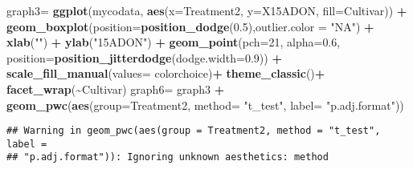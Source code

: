 \documentclass[
]{article}
\newenvironment{Shaded}{\begin{snugshade}}{\end{snugshade}}
\newcommand{\AttributeTok}[1]{\textcolor[rgb]{0.13,0.29,0.53}{#1}}
\newcommand{\DecValTok}[1]{\textcolor[rgb]{0.00,0.00,0.81}{#1}}
\newcommand{\FloatTok}[1]{\textcolor[rgb]{0.00,0.00,0.81}{#1}}
\newcommand{\FunctionTok}[1]{\textcolor[rgb]{0.13,0.29,0.53}{\textbf{#1}}}
\newcommand{\NormalTok}[1]{#1}
\newcommand{\OtherTok}[1]{\textcolor[rgb]{0.56,0.35,0.01}{#1}}
\newcommand{\SpecialCharTok}[1]{\textcolor[rgb]{0.81,0.36,0.00}{\textbf{#1}}}
\newcommand{\StringTok}[1]{\textcolor[rgb]{0.31,0.60,0.02}{#1}}
\begin{document}
\begin{Shaded}
\begin{Highlighting}[]
\NormalTok{graph3}\OtherTok{=} \FunctionTok{ggplot}\NormalTok{(mycodata, }\FunctionTok{aes}\NormalTok{(}\AttributeTok{x=}\NormalTok{Treatment2, }\AttributeTok{y=}\NormalTok{X15ADON, }\AttributeTok{fill=}\NormalTok{Cultivar)) }\SpecialCharTok{+}
  \FunctionTok{geom\_boxplot}\NormalTok{(}\AttributeTok{position=}\FunctionTok{position\_dodge}\NormalTok{(}\FloatTok{0.5}\NormalTok{),}\AttributeTok{outlier.color =} \StringTok{"NA"}\NormalTok{) }\SpecialCharTok{+}
  \FunctionTok{xlab}\NormalTok{(}\StringTok{""}\NormalTok{) }\SpecialCharTok{+} \FunctionTok{ylab}\NormalTok{(}\StringTok{"15ADON"}\NormalTok{) }\SpecialCharTok{+}
  \FunctionTok{geom\_point}\NormalTok{(}\AttributeTok{pch=}\DecValTok{21}\NormalTok{, }\AttributeTok{alpha=}\FloatTok{0.6}\NormalTok{, }\AttributeTok{position=}\FunctionTok{position\_jitterdodge}\NormalTok{(}\AttributeTok{dodge.width=}\FloatTok{0.9}\NormalTok{)) }\SpecialCharTok{+}
  \FunctionTok{scale\_fill\_manual}\NormalTok{(}\AttributeTok{values=}\NormalTok{ colorchoice)}\SpecialCharTok{+}
  \FunctionTok{theme\_classic}\NormalTok{()}\SpecialCharTok{+}
  \FunctionTok{facet\_wrap}\NormalTok{(}\SpecialCharTok{\textasciitilde{}}\NormalTok{Cultivar)}
\NormalTok{graph6}\OtherTok{=}\NormalTok{ graph3 }\SpecialCharTok{+} \FunctionTok{geom\_pwc}\NormalTok{(}\FunctionTok{aes}\NormalTok{(}\AttributeTok{group=}\NormalTok{Treatment2, }\AttributeTok{method=} \StringTok{"t\_test"}\NormalTok{, }\AttributeTok{label=} \StringTok{"p.adj.format"}\NormalTok{))}
\end{Highlighting}
\end{Shaded}

\begin{verbatim}
## Warning in geom_pwc(aes(group = Treatment2, method = "t_test", label =
## "p.adj.format")): Ignoring unknown aesthetics: method
\end{verbatim}
\end{document}
